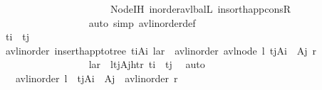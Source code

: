 \begin{isabellebody}
\ \ \ \ \ \ \ \ \ \ \ \ \ \ \ \ \ \ \ \ \ \ Node{\isachardot}{\kern0pt}IH\ inorder{\isacharunderscore}{\kern0pt}avl{\isacharunderscore}{\kern0pt}balL\ insort{\isacharunderscore}{\kern0pt}happ{\isacharunderscore}{\kern0pt}consR\isanewline
\ \ \ \ \ \ \ \ \ \ \ \ \ \ \ \ \isamarkupfalse%
\ {\isacharparenleft}{\kern0pt}auto\ simp{\isacharcolon}{\kern0pt}\ avl{\isacharunderscore}{\kern0pt}inorder{\isacharunderscore}{\kern0pt}def{\isacharparenright}{\kern0pt}\ \ \isanewline
\ \ \ \ \ \ \ \ \ \ \ \ \isamarkupfalse%
\isanewline
\ \ \ \ \ \ \ \ \ \ \ \ \ \ \isamarkupfalse%
\ {\isachardoublequoteopen}t\isactrlsub i\ {\isacharequal}{\kern0pt}\ t\isactrlsub j{\isachardoublequoteclose}\isanewline
\ \ \ \ \ \ \ \ \ \ \ \ \ \ \isamarkupfalse%
\ {\isachardoublequoteopen}avl{\isacharunderscore}{\kern0pt}inorder\ {\isacharparenleft}{\kern0pt}insert{\isacharunderscore}{\kern0pt}happ{\isacharunderscore}{\kern0pt}to{\isacharunderscore}{\kern0pt}tree\ {\isacharparenleft}{\kern0pt}t\isactrlsub i{\isacharcomma}{\kern0pt}A\isactrlsub i{\isacharparenright}{\kern0pt}\ {\isasymlangle}l{\isacharcomma}{\kern0pt}a{\isacharcomma}{\kern0pt}r{\isasymrangle}{\isacharparenright}{\kern0pt}\ {\isacharequal}{\kern0pt}\ avl{\isacharunderscore}{\kern0pt}inorder\ {\isacharparenleft}{\kern0pt}avl{\isacharunderscore}{\kern0pt}node\ l\ {\isacharparenleft}{\kern0pt}t\isactrlsub j{\isacharcomma}{\kern0pt}A\isactrlsub i\ {\isacharat}{\kern0pt}\ A\isactrlsub j{\isacharparenright}{\kern0pt}\ r{\isacharparenright}{\kern0pt}{\isachardoublequoteclose}\isanewline
\ \ \ \ \ \ \ \ \ \ \ \ \ \ \ \ \isamarkupfalse%
\ {\isacartoucheopen}{\isasymlangle}l{\isacharcomma}{\kern0pt}a{\isacharcomma}{\kern0pt}r{\isasymrangle}\ {\isacharequal}{\kern0pt}\ {\isasymlangle}l{\isacharcomma}{\kern0pt}{\isacharparenleft}{\kern0pt}{\isacharparenleft}{\kern0pt}t\isactrlsub j{\isacharcomma}{\kern0pt}A\isactrlsub j{\isacharparenright}{\kern0pt}{\isacharcomma}{\kern0pt}ht{\isacharparenright}{\kern0pt}{\isacharcomma}{\kern0pt}r{\isasymrangle}{\isacartoucheclose}\ {\isacartoucheopen}t\isactrlsub i\ {\isacharequal}{\kern0pt}\ t\isactrlsub j{\isacartoucheclose}\ \isamarkupfalse%
\ auto\isanewline
\ \ \ \ \ \ \ \ \ \ \ \ \ \ \isamarkupfalse%
\ \isamarkupfalse%
\ {\isachardoublequoteopen}{\isachardot}{\kern0pt}{\isachardot}{\kern0pt}{\isachardot}{\kern0pt}\ {\isacharequal}{\kern0pt}\ avl{\isacharunderscore}{\kern0pt}inorder\ l\ {\isacharat}{\kern0pt}\ {\isacharparenleft}{\kern0pt}t\isactrlsub j{\isacharcomma}{\kern0pt}A\isactrlsub i\ {\isacharat}{\kern0pt}\ A\isactrlsub j{\isacharparenright}{\kern0pt}\ {\isacharhash}{\kern0pt}\ avl{\isacharunderscore}{\kern0pt}inorder\ r{\isachardoublequoteclose}\isanewline

\end{isabellebody}
